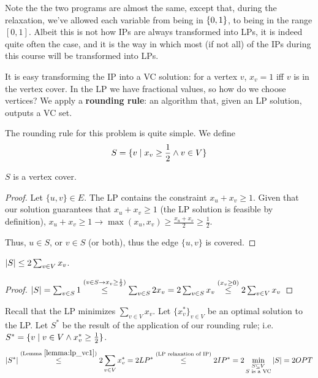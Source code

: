     Note the the two programs are almost the same, except that, during the relaxation, we've allowed each variable from being in $\{ 0,1 \}$, to being in the range $[0,1]$.
    Albeit this is not how IPs are always transformed into LPs, it is indeed quite often the case, and it is the way in which most (if not all) of the IPs during this course will be transformed into LPs.

    It is easy transforming the IP into a VC solution: for a vertex $v$, $x_v = 1$ iff $v$ is in the vertex cover.
    In the LP we have fractional values, so how do we choose vertices? We apply a \textbf{rounding rule}: an algorithm that, given an LP solution, outputs a VC set.

    The rounding rule for this problem is quite simple.
    We define 
    \[ S = \{ v \; \vert \; x_v \geq \frac{1}{2} \wedge v \in V \} \]

    \begin{lemma}
        $S$ is a vertex cover.
    \end{lemma}

    \begin{proof}
        Let $\{ u,v \} \in E$. The LP contains the constraint $x_u + x_v \geq 1$.
        Given that our solution guarantees that $x_u + x_v \geq 1$ (the LP solution is feasible by definition),
        $x_u + x_v \geq 1 \rightarrow \max (x_u, x_v) \geq \frac{x_u + x_v}{2} \geq \frac{1}{2}$.

        Thus, $u \in S$, or $v \in S$ (or both), thus the edge $\{ u,v \}$ is covered.
    \end{proof}

    \begin{lemma}\label{lemma:lp_vc1}
        $\vert S \vert \leq 2 \sum_{v \in V} x_v$.
    \end{lemma}

    \begin{proof}
        $\vert S \vert = \sum_{v \in S} 1 \overset{(v \in S \rightarrow x_v \geq \frac{1}{2})}{\leq} \sum_{v \in S} 2 x_v = 2 \sum_{v \in S} x_v \overset{(x_v \geq 0)}{\leq} 2 \sum_{v \in V} x_v$
    \end{proof}

    Recall that the LP minimizes $\sum_{v \in V} x_v$. Let $\{ x_v^* \}_{v \in V}$ be an optimal solution to the LP.
    Let $S^*$ be the result of the application of our rounding rule; i.e. $S^* = \{ v \; \vert \; v \in V \wedge x_v^* \geq \frac{1}{2} \}$.
    \[ \vert S^* \vert \overset{(\text{Lemma } \ref{lemma:lp_vc1})}{\leq} 2 \sum_{v \in V} x_v^* = 2 LP^* \overset{(\text{LP relaxation of IP})}{\leq} 2 IP^* = 2 \min_{\substack{S \subseteq V\\ S \text{ is a VC}}} \vert S \vert = 2 OPT \]

